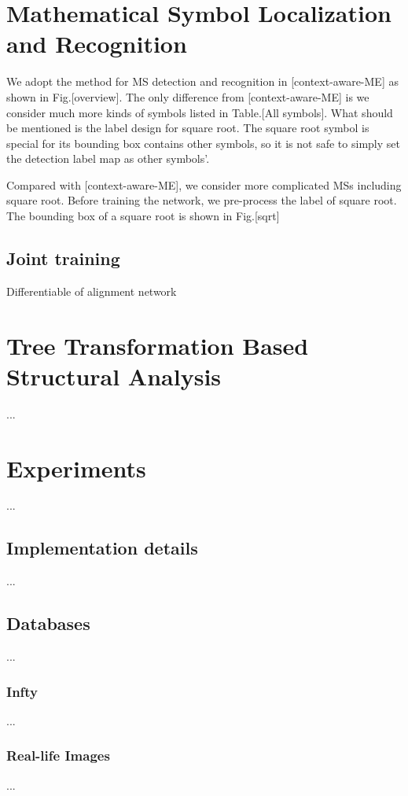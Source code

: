 \documentclass[10pt,conference,a4paper]{IEEEtran}
\begin{document}
	\section{Mathematical Symbol Localization and Recognition}
    We adopt the method for MS detection and recognition in [context-aware-ME] as shown in Fig.[overview]. The only difference from [context-aware-ME] is we consider much more kinds of symbols listed in Table.[All symbols]. What should be mentioned is the label design for square root. The square root symbol is special for its bounding box contains other symbols, so it is not safe to simply set the detection label map as other symbols'. 
    
    
    
    Compared with [context-aware-ME], we consider more complicated MSs including square root.
    Before training the network, we pre-process the label of square root. 
    The bounding box of a square root is shown in Fig.[sqrt]
    
	\subsection{Joint training}
	Differentiable of alignment network
	\section{Tree Transformation Based Structural Analysis}
	...
	\section{Experiments}
	...
	\subsection{Implementation details}
	...
	\subsection{Databases}
	...
	\subsubsection{Infty}
	...
	\subsubsection{Real-life Images}
	...
\end{document}
